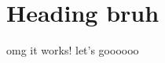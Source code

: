 \documentclass{article}
\begin{document}
\section{Heading bruh}

omg it works! let's goooooo
\end{document}
